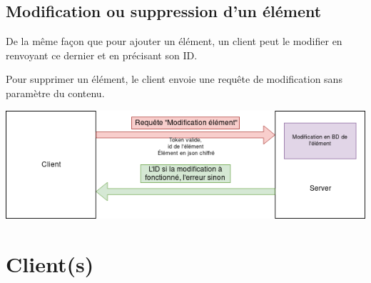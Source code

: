 \documentclass[oneside]{report}
\begin{document}
	\section{Modification ou suppression d'un élément}{
		\par De la même façon que pour ajouter un élément, un client peut le modifier en renvoyant ce dernier et en précisant son ID.
		\par Pour supprimer un élément, le client envoie une requête de modification sans paramètre du contenu.
		\begin{center}
			\includegraphics[scale=.5]{reseau_update_elt}
		\end{center}
	}

	\chapter{Client(s)}
\end{document}
